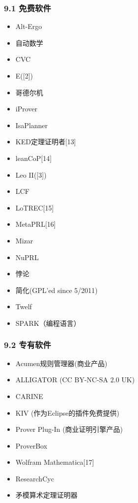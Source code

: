 \subsubsection{9.1 免费软件}
\begin{itemize}
\item Alt-Ergo
\item 自动数学
\item CVC
\item E([2])
\item 哥德尔机
\item iProver
\item IsaPlanner
\item KED定理证明者[13]
\item leanCoP[14]
\item Leo II([3])
\item LCF
\item LoTREC[15]
\item MetaPRL[16]
\item Mizar
\item NuPRL
\item 悖论
\item 简化(GPL'ed since 5/2011)
\item Twelf
\item SPARK（编程语言）
\end{itemize}
\subsubsection{9.2 专有软件}
\begin{itemize}
\item Acumen规则管理器(商业产品)
\item ALLIGATOR (CC BY-NC-SA 2.0 UK)
\item CARINE
\item KIV (作为Eclipse的插件免费提供)
\item Prover Plug-In (商业证明引擎产品)
\item ProverBox
\item Wolfram Mathematica[17]
\item ResearchCyc
\item 矛模算术定理证明器
\end{itemize}


